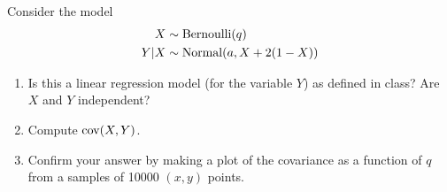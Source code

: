 \begin{exercise}
Consider the model 
\begin{align*}
X &\sim {\rm Bernoulli}(q)\\
Y|X &\sim {\rm Normal}(a,X + 2(1-X))
\end{align*}

\begin{enumerate}[label=(\alph*)]
\item Is this a linear regression model (for the variable $Y$) as defined in class? Are $X$ and $Y$ independent?
\item Compute ${\rm cov}(X,Y)$. 
\item Confirm your answer by making a plot of the covariance as a function of $q$ from a samples of 10000 $(x,y)$ points. 
\end{enumerate} 
\end{exercise}

